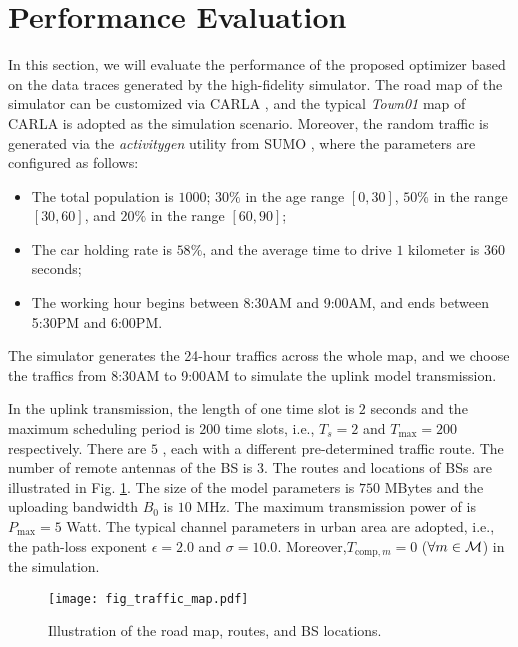 \section{Performance Evaluation}
\label{sec:simulation}
In this section, we will evaluate the performance of the proposed {\fwName} optimizer based on the data traces generated by the high-fidelity {\fwName} simulator. The road map of the {\fwName} simulator can be customized via CARLA \cite{CARLA}, and the typical \emph{Town01} map of CARLA is adopted as the simulation scenario. Moreover, the random traffic is generated via the \emph{activitygen} utility from SUMO \cite{SUMO}, where the parameters are configured as follows:
\begin{itemize}
    \item The total population is $1000$; $30\%$ in the age range $[0, 30]$, $50\%$ in the range $[30, 60]$, and $20\%$ in the range $[60, 90]$;
    \item The car holding rate is $58\%$, and the average time to drive $1$ kilometer is $360$ seconds;
    \item The working hour begins between 8:30AM and 9:00AM, and ends between 5:30PM and 6:00PM.
\end{itemize}
The simulator generates the 24-hour traffics across the whole map, and we choose the traffics from 8:30AM to 9:00AM to simulate the uplink model transmission.

In the uplink transmission, the length of one time slot is $2$ seconds and the maximum scheduling period is $200$ time slots, i.e., $T_s=2$ and $T_{\max}=200$ respectively.
There are $5$ {\IAVs}, each with a different pre-determined traffic route.
The number of remote antennas of the BS is $3$. The routes and locations of BSs are illustrated in Fig. \ref{fig:traffic_map}. The size of the model parameters is $750$ MBytes and the uploading bandwidth $B_0$ is $10$ MHz. The maximum transmission power of {\IAVs} is $P_{\max} = 5$ Watt. The typical channel parameters in urban area are adopted, i.e., the path-loss exponent $\epsilon=2.0$ and $\sigma=10.0$. Moreover,$T_{\text{comp},m}=0$ ($\forall m\in\mathcal{M}$) in the simulation.

\begin{figure}[htp!]
    \centering
    \texttt{[image: fig\_traffic\_map.pdf]}
    \caption{Illustration of the road map, {\IAV} routes, and BS locations.}
    \label{fig:traffic_map}
\end{figure}

